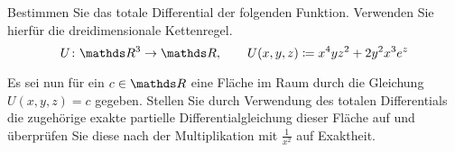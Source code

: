 \begin{atiTask}[
  title = Vollständiges Differential
]
  \begin{atiSubtasks}
    \item{
      Bestimmen Sie das totale Differential der folgenden Funktion.
      Verwenden Sie hierfür die dreidimensionale Kettenregel.
      \[
        \func{U}{\setR^3}{\setR}\separate U(x,y,z)\define x^4yz^2 + 2y^2x^3e^z
      \]
    }
    \item{
      Es sei nun für ein $c\in\setR$ eine Fläche im Raum durch die Gleichung $U(x,y,z)=c$ gegeben.
      Stellen Sie durch Verwendung des totalen Differentials die zugehörige exakte partielle Differentialgleichung dieser Fläche auf und überprüfen Sie diese nach der Multiplikation mit $\frac{1}{x^2}$ auf Exaktheit.
    }
  \end{atiSubtasks}
\end{atiTask}
